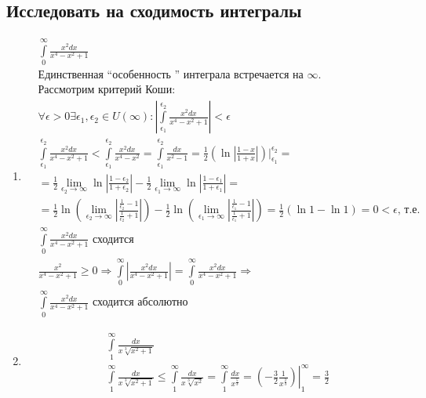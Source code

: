 \documentclass[a4paper, 12pt]{article}
\begin{document}
\subsection{Исследовать на сходимость интегралы}
\begin{enumerate}
 \item %
 \begin{align*}
  &\int\limits_0^\infty \frac{x^2dx}{x^4-x^2+1} \\
  &\text{Единственная ``особенность '' интеграла встречается на $\infty$.} \\
  &\text{Рассмотрим критерий Коши:} \\
  &\forall\epsilon>0 \exists \epsilon_1,\epsilon_2 \in U(\infty):
  \left|\int\limits_{\epsilon_1}^{\epsilon_2} \frac{x^2dx}{x^4-x^2+1}\right| < \epsilon \\
  &\int\limits_{\epsilon_1}^{\epsilon_2} \frac{x^2dx}{x^4-x^2+1} < 
  \int\limits_{\epsilon_1}^{\epsilon_2} \frac{x^2dx}{x^4-x^2} = 
  \int\limits_{\epsilon_1}^{\epsilon_2} \frac{dx}{x^2-1} = 
  \frac{1}{2}\left(\ln\left|\frac{1-x}{1+x}\right|\right)\Big|_{\epsilon_1}^{\epsilon_2} = \\
  &=\frac{1}{2}\lim_{\epsilon_2\to\infty}\ln\left|\frac{1-\epsilon_2}{1+\epsilon_2}\right| -
  \frac{1}{2}\lim_{\epsilon_1\to\infty}\ln\left|\frac{1-\epsilon_1}{1+\epsilon_1}\right| = \\
  &=\frac{1}{2}\ln\left(\lim_{\epsilon_2\to\infty}\left|\frac{\frac{1}{\epsilon_2}-1}{\frac{1}{\epsilon_2}+1}\right|\right) -
  \frac{1}{2}\ln\left(\lim_{\epsilon_1\to\infty}\left|\frac{\frac{1}{\epsilon_1}-1}{\frac{1}{\epsilon_1}+1}\right|\right) = \frac{1}{2}(\ln 1 - \ln 1) = 0 < \epsilon \text{, т.е.} \\
  &\int\limits_0^\infty \frac{x^2dx}{x^4-x^2+1} \text{ сходится} \\
  &\frac{x^2}{x^4-x^2+1} \geq0 \Rightarrow
  \int\limits_0^\infty\left| \frac{x^2dx}{x^4-x^2+1}\right| = 
  \int\limits_0^\infty \frac{x^2dx}{x^4-x^2+1} \Rightarrow \\
  &\int\limits_0^\infty \frac{x^2dx}{x^4-x^2+1} \text{ сходится абсолютно}
 \end{align*}
\item %
\begin{align*}
 &\int\limits_1^\infty \frac{dx}{x\sqrt[3]{x^2+1}} \\
 &\int\limits_1^\infty \frac{dx}{x\sqrt[3]{x^2+1}} \leq 
 \int\limits_1^\infty \frac{dx}{x\sqrt[3]{x^2}} = 
 \int\limits_1^\infty \frac{dx}{x^\frac{5}{3}} = 
 \left.\left(-\frac{3}{2}\frac{1}{x^\frac{2}{3}}\right)\right|_1^\infty = \frac{3}{2}

\end{align*}
\end{enumerate}
\end{document}
